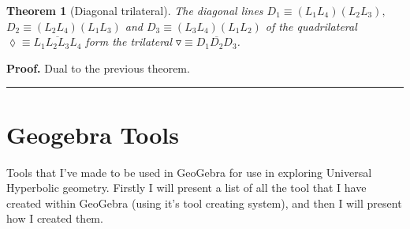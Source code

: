 \documentclass{unswthesis}
\newtheorem{theorem}{Theorem}
\newenvironment{proof}[1][Proof]{\noindent\textbf{#1.} }{\ \rule{0.5em}{0.5em}}
\begin{document}
\begin{theorem}[Diagonal trilateral]
The diagonal lines $D_{1}\equiv(L_{1}L_{4})(L_{2}L_{3}),$\newline
$D_{2}\equiv(L_{2}L_{4})(L_{1}L_{3})$ and $D_{3}%
\equiv(L_{3}L_{4})(L_{1}L_{2})$ of the quadrilateral $\lozenge\equiv%
\overline{L_{1}L_{2}L_{3}L_{4}}$ form the trilateral $\triangledown\equiv%
\overline{D_{1}D_{2}D_{3}}$.
\end{theorem}

\begin{proof}
Dual to the previous theorem.
\end{proof}

\pagebreak

\section{\protect\bigskip Geogebra Tools}

Tools that I've made to be used in GeoGebra for use in exploring Universal
Hyperbolic geometry. Firstly I will present a list of all the tool that I
have created within GeoGebra (using it's tool creating system), and then I
will present how I created them.\newline

\bigskip 
\end{document}
